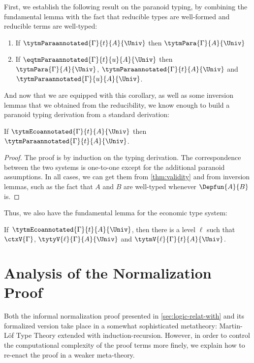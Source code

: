 First, we establish the following result on the paranoid
typing, by combining the fundamental lemma with the fact that
reducible types are well-formed and reducible terms are well-typed:
%
\begin{corollary} \label{thm:validity} \phantom{a}
  \begin{enumerate}
    \item If $\tytmParaannotated{\Gamma}{t}{A}{\Univ}$ then $\tytmPara{\Gamma}{A}{\Univ}$ 
    \item If $\eqtmParaannotated{\Gamma}{t}{u}{A}{\Univ}$ then
  $\tytmPara{\Gamma}{A}{\Univ}$,
  $\tytmParaannotated{\Gamma}{t}{A}{\Univ}$ and $\tytmParaannotated{\Gamma}{u}{A}{\Univ}$.
  \end{enumerate}
\end{corollary}
%
And now that we are equipped with this corollary, as well as some
inversion lemmas that we obtained from the reducibility, we know
enough to build a paranoid typing derivation from a
standard derivation:
%
\begin{theorem}
  \label{thm:nonparanoid}
  If $\tytmEcoannotated{\Gamma}{t}{A}{\Univ}$ then $\tytmParaannotated{\Gamma}{t}{A}{\Univ}$.
\end{theorem}
\begin{proof}
  The proof is by induction on the typing derivation. The
  correspondence between the two systems is one-to-one except for the
  additional paranoid assumptions.
  In all cases, we can get them from \cref{thm:validity} and from
  inversion lemmas, such as the fact that $A$ and $B$ are well-typed
  whenever $\Depfun{A}{B}$ is.
\end{proof}

Thus, we also have the fundamental lemma for the economic type system:
%
\begin{corollary}
  If\, \( \tytmEcoannotated{\Gamma}{t}{A}{\Univ} \), then there is a level \( \ell \) such that $\ctxV{\Gamma}$,
  \( \tytyV{\ell}{\Gamma}{A}{\Univ} \) and \( \tytmV{\ell}{\Gamma}{t}{A}{\Univ} \).
\end{corollary}

\section{Analysis of the Normalization Proof}
\label{sec:analys-norm-proof}

Both the informal normalization proof presented in \cref{sec:logic-relat-with}
and its formalized version take place in a somewhat sophisticated metatheory: 
Martin-Löf Type Theory extended with induction-recursion.
%
However, in order to control the computational complexity of the proof terms
more finely, we explain how to re-enact the proof in a weaker meta-theory.

